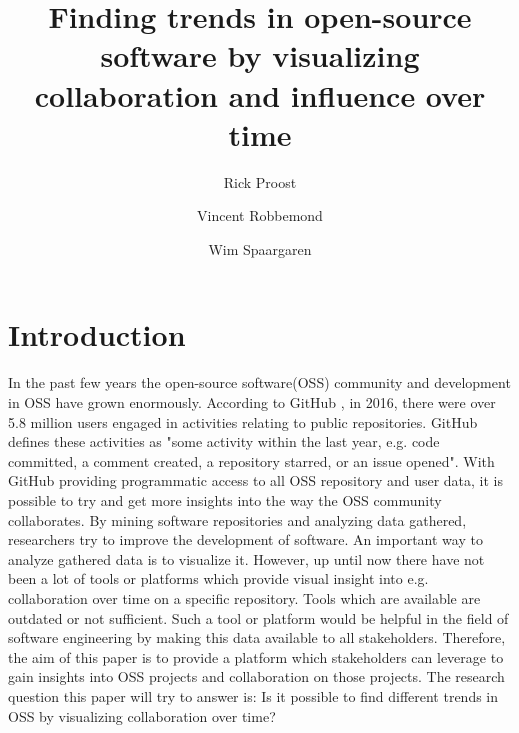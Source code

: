 \documentclass[acmtog, authorversion]{acmart}
\begin{document}
\title{Finding trends in open-source software by visualizing collaboration and influence over time} 

\author{Rick Proost}

\author{Vincent Robbemond}

\author{Wim Spaargaren}

\maketitle

\begin{abstract}
	
\end{abstract}

\section{Introduction}
In the past few years the open-source software(OSS) community and development in OSS have grown enormously.
According to GitHub \cite{GHOctoverse}, in 2016, there were over 5.8 million users engaged in activities relating to public repositories.
GitHub defines these activities as "some activity within the last year, e.g. code committed, a comment created, a repository starred, or an issue opened".
With GitHub providing programmatic access to all OSS repository and user data\cite{GHAPI}, it is possible to try and get more insights into the way the OSS community collaborates.
By mining software repositories and analyzing data gathered, researchers try to improve the development of software.
An important way to analyze gathered data is to visualize it.
However, up until now there have not been a lot of tools or platforms which provide visual insight into e.g. collaboration over time on a specific repository.
Tools which are available are outdated or not sufficient.
Such a tool or platform would be helpful in the field of software engineering by making this data available to all stakeholders.
Therefore, the aim of this paper is to provide a platform which stakeholders can leverage to gain insights into OSS projects and collaboration on those projects.
The research question this paper will try to answer is: Is it possible to find different trends in OSS by visualizing collaboration over time?
\end{document}
